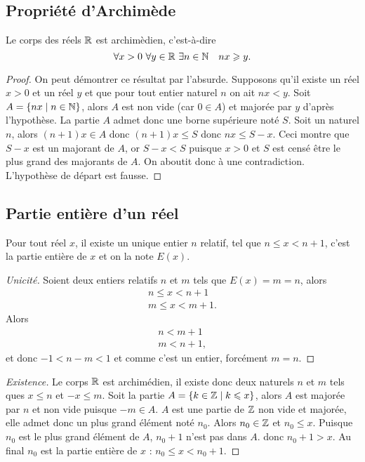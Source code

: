 \subsection{Propriété d'Archimède}
\begin{prop}
  Le corps des réels \(\mathbb{R}\) est archimèdien, c'est-à-dire
  \begin{equation}
    \forall x>0 \ \forall y\in \R \ \exists n\in \N \quad nx\geqslant y.
  \end{equation}
\end{prop}
\begin{proof}
  On peut démontrer ce résultat par l'absurde. Supposons qu'il existe un réel \(x>0\) et un réel \(y\) et que pour tout entier naturel \(n\) on ait \(nx<y\). Soit \(A=\left\{nx\mathrel{}\middle|\mathrel{}n\in \mathbb{N}\right\}\), alors \(A\) est non vide (car \(0\in A\)) et majorée par \(y\) d'après l'hypothèse. La partie \(A\) admet donc une borne supérieure noté \(S\). Soit un naturel \(n\), alors \((n+1)x \in A\) donc \((n+1)x\leqslant S\) donc \(nx \leqslant S-x\). Ceci montre que \(S-x\) est un majorant de \(A\), or \(S-x<S\) puisque \(x>0\) et \(S\) est censé être le plus grand des majorants de \(A\). On aboutit donc à une contradiction. L'hypothèse de départ est fausse.
\end{proof}

\subsection{Partie entière d'un réel}

\begin{prop}
  Pour tout réel \(x\), il existe un unique entier \(n\) relatif, tel que \(n\leqslant x<n+1\), c'est la partie entière de \(x\) et on la note \(E(x)\).
\end{prop}
\begin{proof}[Unicité]
  Soient deux entiers relatifs \(n\) et \(m\) tels que \(E(x)=m=n\), alors
  \begin{align}
    n\leqslant x< n+1 \\  m\leqslant x< m+1.
  \end{align}
  Alors
  \begin{align}
    n<m+1 \\  m<n+1,
  \end{align}
  et donc \(-1<n-m<1\) et comme c'est un entier, forcément \(m=n\).
\end{proof}
\begin{proof}[Existence]
  Le corps \(\mathbb{R}\) est archimédien, il existe donc deux naturels \(n\) et \(m\) tels ques \(x\leqslant n\) et  \(-x\leqslant m\). Soit la partie \(A=\left\{k \in \mathbb{Z}\mathrel{}\middle|\mathrel{}k\leqslant x\right\}\), alors \(A\) est majorée par \(n\) et non vide puisque \(-m\in A\). \(A\) est une partie de \(\mathbb{Z}\) non vide et majorée, elle admet donc un plus grand élément noté \(n_0\). Alors \(n_0\in \mathbb{Z}\) et \(n_0\leqslant x\). Puisque \(n_0\) est le plus grand élément de \(A\), \(n_0+1\) n'est pas dans \(A\). donc \(n_0+1>x\). Au final \(n_0\) est la partie entière de \(x\) : \(n_0\leqslant x<n_0+1\).
\end{proof}

